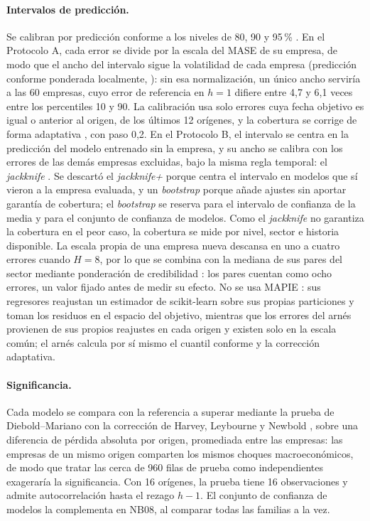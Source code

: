 \documentclass[12pt,letterpaper,oneside]{report}
\renewcommand{\_}{\UnderscoreOriginal\allowbreak}
\begin{document}
\paragraph{Intervalos de predicción.} Se calibran por predicción conforme a los niveles de 80, 90 y 95\,\% \parencite{vovk2005algorithmic}. En el Protocolo A, cada error se divide por la escala del MASE de su empresa, de modo que el ancho del intervalo sigue la volatilidad de cada empresa (predicción conforme ponderada localmente, \parencite{lei2018distribution}): sin esa normalización, un único ancho serviría a las 60 empresas, cuyo error de referencia en $h = 1$ difiere entre 4,7 y 6,1 veces entre los percentiles 10 y 90. La calibración usa solo errores cuya fecha objetivo es igual o anterior al origen, de los últimos 12 orígenes, y la cobertura se corrige de forma adaptativa \parencite{gibbs2021aci}, con paso 0{,}2. En el Protocolo B, el intervalo se centra en la predicción del modelo entrenado sin la empresa, y su ancho se calibra con los errores de las demás empresas excluidas, bajo la misma regla temporal: el \textit{jackknife} \parencite{barber2021jackknife}. Se descartó el \textit{jackknife+} porque centra el intervalo en modelos que sí vieron a la empresa evaluada, y un \textit{bootstrap} porque añade ajustes sin aportar garantía de cobertura; el \textit{bootstrap} se reserva para el intervalo de confianza de la media y para el conjunto de confianza de modelos. Como el \textit{jackknife} no garantiza la cobertura en el peor caso, la cobertura se mide por nivel, sector e historia disponible. La escala propia de una empresa nueva descansa en uno a cuatro errores cuando $H = 8$, por lo que se combina con la mediana de sus pares del sector mediante ponderación de credibilidad \parencite{buhlmann2005credibility}: los pares cuentan como ocho errores, un valor fijado antes de medir su efecto. No se usa MAPIE \parencite{taquet2022mapie}: sus regresores reajustan un estimador de scikit-learn sobre sus propias particiones y toman los residuos en el espacio del objetivo, mientras que los errores del arnés provienen de sus propios reajustes en cada origen y existen solo en la escala común; el arnés calcula por sí mismo el cuantil conforme y la corrección adaptativa.

\paragraph{Significancia.} Cada modelo se compara con la referencia a superar mediante la prueba de Diebold--Mariano con la corrección de Harvey, Leybourne y Newbold \parencite{diebold1995comparing,harvey1997testing}, sobre una diferencia de pérdida absoluta por origen, promediada entre las empresas: las empresas de un mismo origen comparten los mismos choques macroeconómicos, de modo que tratar las cerca de 960 filas de prueba como independientes exageraría la significancia. Con 16 orígenes, la prueba tiene 16 observaciones y admite autocorrelación hasta el rezago $h - 1$. El conjunto de confianza de modelos \parencite{hansen2011mcs} la complementa en NB08, al comparar todas las familias a la vez.
\end{document}
